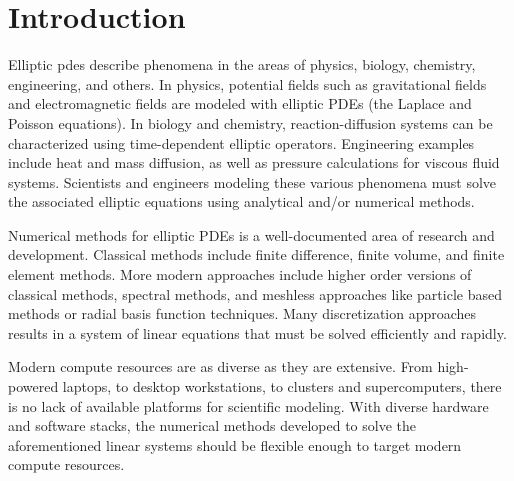 \section{Introduction}

Elliptic \gls{pdes} describe phenomena in the areas of physics, biology, chemistry, engineering, and others. In physics, potential fields such as gravitational fields and electromagnetic fields are modeled with elliptic PDEs (the Laplace and Poisson equations). In biology and chemistry, reaction-diffusion systems can be characterized using time-dependent elliptic operators. Engineering examples include heat and mass diffusion, as well as pressure calculations for viscous fluid systems. Scientists and engineers modeling these various phenomena must solve the associated elliptic equations using analytical and/or numerical methods.

Numerical methods for elliptic PDEs is a well-documented area of research and development. Classical methods include finite difference, finite volume, and finite element methods. More modern approaches include higher order versions of classical methods, spectral methods, and meshless approaches like particle based methods or radial basis function techniques. Many discretization approaches results in a system of linear equations that must be solved efficiently and rapidly. 

Modern compute resources are as diverse as they are extensive. From high-powered laptops, to desktop workstations, to clusters and supercomputers, there is no lack of available platforms for scientific modeling. With diverse hardware and software stacks, the numerical methods developed to solve the aforementioned linear systems should be flexible enough to target modern compute resources. 

